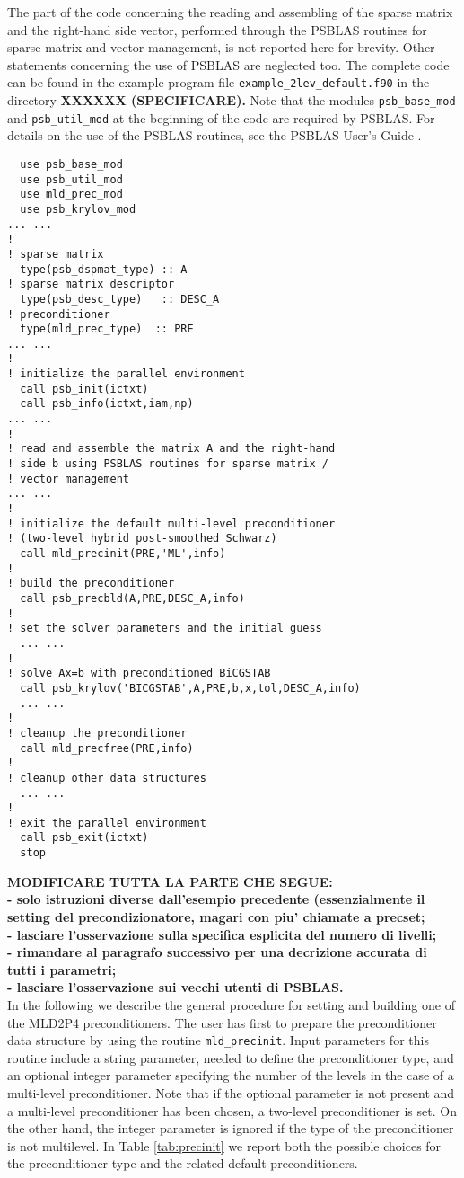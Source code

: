 The part of the code concerning the
reading and assembling of the sparse matrix and the right-hand side vector, performed
through the PSBLAS routines for sparse matrix and vector management, is not reported
here for brevity. Other statements concerning the use of PSBLAS are neglected too.
The complete code can be found in the example program file \verb|example_2lev_default.f90|
in the directory \textbf{XXXXXX (SPECIFICARE).} Note that the modules \verb|psb_base_mod|
and \verb|psb_util_mod| at the beginning of the code are required by PSBLAS.
For details on the use of the PSBLAS routines, see the PSBLAS User's Guide \cite{}.

\begin{verbatim}
  use psb_base_mod
  use psb_util_mod 
  use mld_prec_mod
  use psb_krylov_mod
... ...
!
! sparse matrix
  type(psb_dspmat_type) :: A
! sparse matrix descriptor
  type(psb_desc_type)   :: DESC_A
! preconditioner
  type(mld_prec_type)  :: PRE
... ...
!
! initialize the parallel environment
  call psb_init(ictxt)
  call psb_info(ictxt,iam,np)
... ...
!
! read and assemble the matrix A and the right-hand
! side b using PSBLAS routines for sparse matrix /
! vector management
... ...
!
! initialize the default multi-level preconditioner
! (two-level hybrid post-smoothed Schwarz)
  call mld_precinit(PRE,'ML',info)
!
! build the preconditioner
  call psb_precbld(A,PRE,DESC_A,info)
!
! set the solver parameters and the initial guess
  ... ...
!
! solve Ax=b with preconditioned BiCGSTAB
  call psb_krylov('BICGSTAB',A,PRE,b,x,tol,DESC_A,info)
  ... ...
!
! cleanup the preconditioner
  call mld_precfree(PRE,info)
!
! cleanup other data structures
  ... ...
!
! exit the parallel environment
  call psb_exit(ictxt)
  stop
\end{verbatim}


\textbf{MODIFICARE TUTTA LA PARTE CHE SEGUE:\\
- solo istruzioni diverse dall'esempio precedente (essenzialmente il setting del precondizionatore, magari con piu' chiamate a precset;\\
- lasciare l'osservazione sulla specifica esplicita del numero di livelli;\\
- rimandare al paragrafo successivo per una decrizione accurata di tutti i parametri;\\
- lasciare l'osservazione sui vecchi utenti di PSBLAS.}\\

In the following we describe the general procedure for setting and building one of the MLD2P4 preconditioners.
The user has first to prepare the preconditioner data structure by using the routine \verb|mld_precinit|. Input parameters
for this routine include a string parameter, needed to define the preconditioner type, and an optional integer parameter
specifying the number of the levels in the case of a multi-level preconditioner.
Note that if the optional parameter is not present and a multi-level preconditioner has been chosen,
a two-level preconditioner is set. On the other hand, the integer parameter is ignored if the type of the preconditioner is not multilevel.
In Table \ref{tab:precinit} we report both the possible choices for the preconditioner type
and the related default preconditioners. 


